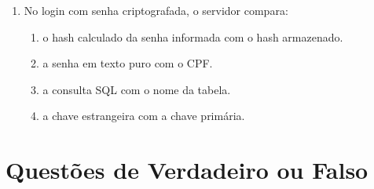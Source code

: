 \documentclass[12pt,a4paper]{article}
\begin{document}
\begin{enumerate}[label=\textbf{Q\arabic*.}]
\begin{enumerate}[label=\alph*)]
    \item o hash da senha combinada com salt.
    \item a senha em texto puro.
    \item apenas o CPF do usuário.
    \item o comando SQL completo.
\end{enumerate}

\item No login com senha criptografada, o servidor compara:

\begin{enumerate}[label=\alph*)]
    \item o hash calculado da senha informada com o hash armazenado.
    \item a senha em texto puro com o CPF.
    \item a consulta SQL com o nome da tabela.
    \item a chave estrangeira com a chave primária.
\end{enumerate}

\end{enumerate}

\section{Questões de Verdadeiro ou Falso}
\end{document}
